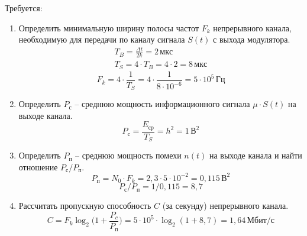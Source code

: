 \documentclass[a4paper, 12pt]{article}
\begin{document}
Требуется:
\begin{enumerate}
  \item Определить минимальную ширину полосы частот $F_k$ 
  непрерывного канала, необходимую для передачи по каналу сигнала 
  $S(t)$ с выхода модулятора.
  \begin{equation}
    \begin{split}
      T_B=\frac{\Delta t}{2k}=2\,мкс\\
      T_S=4\cdot T_B=4\cdot2=8\,мкс
    \end{split}
  \end{equation}
  \begin{equation}
    F_k=4\cdot\frac{1}{T_S}=4\cdot\frac{1}{8\cdot10^{-6}}=5\cdot10^5\,Гц
  \end{equation}

  \item Определить $P_с$ -- среднюю мощность информационного сигнала
  $\mu\cdot S(t)$ на выходе канала.
  \begin{equation}
    P_с=\frac{E_{ср}}{T_S}=h^2=1\,В^2
  \end{equation}

  \item Определить $P_п$ -- среднюю мощность помехи $n(t)$ на выходе 
  канала и найти отношение $P_с/P_п$.
  \begin{equation}
    P_п=N_0\cdot F_k=2,3\cdot5\cdot10^{-2}=0,115\,В^2
  \end{equation}
  \begin{equation}
    P_с/P_п=1/0,115=8,7
  \end{equation}
  
  \item Рассчитать пропускную способность $C$ (за секунду) 
  непрерывного канала.
  \begin{equation}
    C=F_k\log_2\biggr(1+\frac{P_c}{P_п}\biggr)
    =5\cdot 10^5\cdot\log_2(1+8,7)=1,64\,Мбит/с
  \end{equation}
\end{enumerate}
\end{document}
